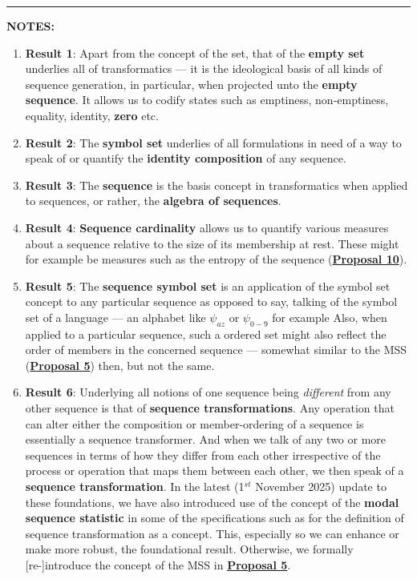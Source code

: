 \documentclass[a4paper, 18pt]{book} %
\begin{document}
\begin{appendices}
{
\noindent\rule{\linewidth}{0.4pt}

\textbf{NOTES:}

\begin{enumerate}
\item \textbf{Result 1}: Apart from the concept of the set, that of the \textbf{empty set} underlies all of transformatics --- it is the ideological basis of all kinds of sequence generation, in particular, when projected unto the \textbf{empty sequence}. It allows us to codify states such as emptiness, non-emptiness, equality, identity, \textbf{zero} etc. 
\item \textbf{Result 2}: The \textbf{symbol set} underlies of all formulations in need of a way to speak of or quantify the \textbf{identity composition} of any sequence.
\item \textbf{Result 3}: The \textbf{sequence} is the basis concept in transformatics when applied to sequences, or rather, the \textbf{algebra of sequences}\cite{treealgebras_review}.
\item \textbf{Result 4}: \textbf{Sequence cardinality} allows us to quantify various measures about a sequence relative to the size of its membership at rest. These might for example be measures such as the entropy of the sequence (\textbf{\hyperref[PROPTOE]{Proposal 10}}).
\item \textbf{Result 5}: The \textbf{sequence symbol set} is an application of the symbol set concept to any particular sequence as opposed to say, talking of the symbol set of a language --- an alphabet like $\psi_{az}$ or $\psi_{0-9}$ for example Also, when applied to a particular sequence, such a ordered set might also reflect the order of members in the concerned sequence --- somewhat similar to the MSS (\textbf{\hyperref[PROP5]{Proposal 5}}) then, but not the same.
\item \textbf{Result 6}: Underlying all notions of one sequence being \textit{different} from any other sequence is that of \textbf{sequence transformations}. Any operation that can alter either the composition or member-ordering of a sequence is essentially a sequence transformer. And when we talk of any two or more sequences in terms of how they differ from each other irrespective of the process or operation that maps them between each other, we then speak of a \textbf{sequence transformation}. In the latest (1$^{st}$ November 2025) update to these foundations, we have also introduced use of the concept of the \textbf{modal sequence statistic} in some of the specifications such as for the definition of sequence transformation as a concept. This, especially so we can enhance or make more robust, the foundational result. Otherwise, we formally [re-]introduce the concept of the MSS in \textbf{\hyperref[PROP5]{Proposal 5}}.

\end{enumerate}}
\end{appendices}
\end{document}

